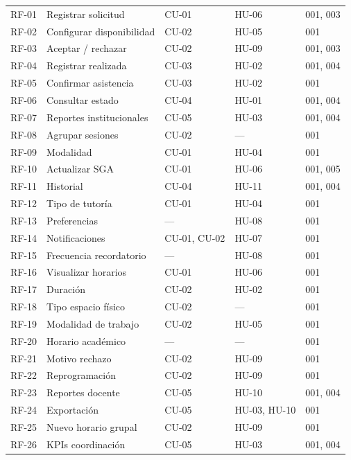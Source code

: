 \documentclass[11pt,a4paper,twoside]{report}
\begin{document}
\begin{longtable}{@{}p{1.5cm}p{4.5cm}p{2.5cm}p{2.5cm}p{2.5cm}@{}}
    RF-01 & Registrar solicitud       & CU-01 & HU-06 & 001, 003 \\
    RF-02 & Configurar disponibilidad & CU-02 & HU-05 & 001 \\
    RF-03 & Aceptar / rechazar        & CU-02 & HU-09 & 001, 003 \\
    RF-04 & Registrar realizada       & CU-03 & HU-02 & 001, 004 \\
    RF-05 & Confirmar asistencia      & CU-03 & HU-02 & 001 \\
    RF-06 & Consultar estado          & CU-04 & HU-01 & 001, 004 \\
    RF-07 & Reportes institucionales  & CU-05 & HU-03 & 001, 004 \\
    RF-08 & Agrupar sesiones          & CU-02 & ---   & 001 \\
    RF-09 & Modalidad                 & CU-01 & HU-04 & 001 \\
    RF-10 & Actualizar SGA            & CU-01 & HU-06 & 001, 005 \\
    RF-11 & Historial                 & CU-04 & HU-11 & 001, 004 \\
    RF-12 & Tipo de tutor\'ia         & CU-01 & HU-04 & 001 \\
    RF-13 & Preferencias              & ---   & HU-08 & 001 \\
    RF-14 & Notificaciones            & CU-01, CU-02 & HU-07 & 001 \\
    RF-15 & Frecuencia recordatorio   & ---   & HU-08 & 001 \\
    RF-16 & Visualizar horarios       & CU-01 & HU-06 & 001 \\
    RF-17 & Duraci\'on                & CU-02 & HU-02 & 001 \\
    RF-18 & Tipo espacio f\'isico     & CU-02 & ---   & 001 \\
    RF-19 & Modalidad de trabajo      & CU-02 & HU-05 & 001 \\
    RF-20 & Horario acad\'emico       & ---   & ---   & 001 \\
    RF-21 & Motivo rechazo            & CU-02 & HU-09 & 001 \\
    RF-22 & Reprogramaci\'on          & CU-02 & HU-09 & 001 \\
    RF-23 & Reportes docente          & CU-05 & HU-10 & 001, 004 \\
    RF-24 & Exportaci\'on             & CU-05 & HU-03, HU-10 & 001 \\
    RF-25 & Nuevo horario grupal      & CU-02 & HU-09 & 001 \\
    RF-26 & KPIs coordinaci\'on       & CU-05 & HU-03 & 001, 004 \\
    \bottomrule
\end{longtable}
\end{document}
